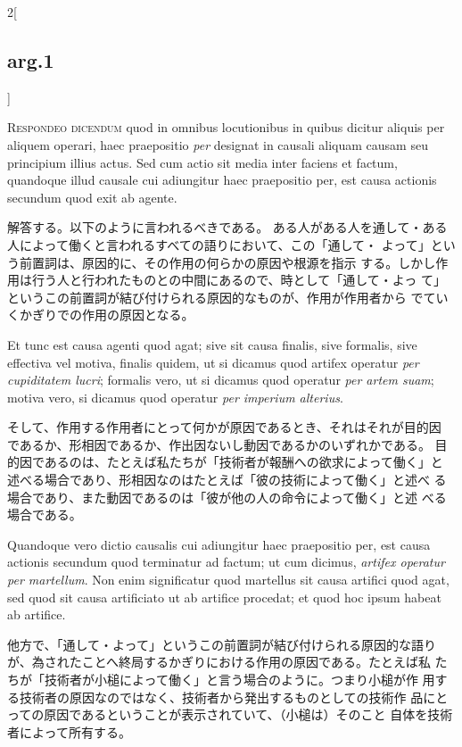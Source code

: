 \documentclass[paper=a4paper,fontsize=10pt,jafontsize=9pt,titlepage]{jlreq}
\begin{document}
\begin{paracol}{2}[\subsection{arg.1}]

{\scshape Respondeo dicendum} quod in omnibus locutionibus in quibus dicitur
aliquis per aliquem operari, haec praepositio {\itshape per} designat in causali
aliquam causam seu principium illius actus. Sed cum actio sit media
inter faciens et factum, quandoque illud causale cui adiungitur haec
praepositio per, est causa actionis secundum quod exit ab agente.

\switchcolumn

解答する。以下のように言われるべきである。
ある人がある人を通して・ある人によって働くと言われるすべての語りにおいて、この「通して・
 よって」という前置詞は、原因的に、その作用の何らかの原因や根源を指示
 する。しかし作用は行う人と行われたものとの中間にあるので、時として「通して・よっ
 て」というこの前置詞が結び付けられる原因的なものが、作用が作用者から
 でていくかぎりでの作用の原因となる。

\switchcolumn*

Et
tunc est causa agenti quod agat; sive sit causa finalis, sive
formalis, sive effectiva vel motiva, finalis quidem, ut si dicamus
quod  artifex operatur {\itshape per cupiditatem lucri}; formalis vero, ut si
dicamus quod operatur {\itshape per artem suam}; motiva vero, si dicamus quod
operatur {\itshape per imperium alterius}.

\switchcolumn

そして、作用する作用者にとって何かが原因であるとき、それはそれが目的因
 であるか、形相因であるか、作出因ないし動因であるかのいずれかである。
目的因であるのは、たとえば私たちが「技術者が報酬への欲求によって働く」と
 述べる場合であり、形相因なのはたとえば「彼の技術によって働く」と述べ
 る場合であり、また動因であるのは「彼が他の人の命令によって働く」と述
 べる場合である。

\switchcolumn*

Quandoque vero dictio causalis cui adiungitur haec praepositio per,
est causa actionis secundum quod terminatur ad factum; ut cum dicimus,
{\itshape artifex operatur per martellum}. Non enim significatur quod martellus
sit causa artifici quod agat, sed quod sit causa artificiato ut ab
artifice procedat; et quod hoc ipsum habeat ab artifice.

\switchcolumn

他方で、「通して・よって」というこの前置詞が結び付けられる原因的な語り
 が、為されたことへ終局するかぎりにおける作用の原因である。たとえば私
 たちが「技術者が小槌によって働く」と言う場合のように。つまり小槌が作
 用する技術者の原因なのではなく、技術者から発出するものとしての技術作
 品にとっての原因であるということが表示されていて、（小槌は）そのこと
 自体を技術者によって所有する。


\end{paracol}
\end{document}
